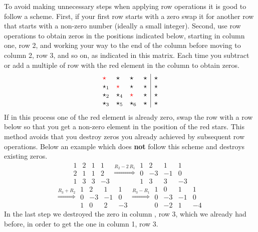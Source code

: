 \documentclass[
  a4paper,
  DIV=11,
  numbers=noendperiod,
  oneside]{scrreprt}
\theoremstyle{definition}
\theoremstyle{remark}
\begin{document}
\begin{tcolorbox}
To avoid making unnecessary steps when applying row operations it is
good to follow a scheme. First, if your first row starts with a zero
swap it for another row that starts with a non-zero number (ideally a
small integer). Second, use row operations to obtain zeros in the
positions indicated below, starting in column one, row 2, and working
your way to the end of the column before moving to column 2, row 3, and
so on, as indicated in this matrix. Each time you subtract or add a
multiple of row with the red element in the column to obtain zeros.
\[\begin{array}{llll|r}
 {\color{red}\star} &  \star& \star & \star & \star  \\
 \star_1 &  {\color{red}\star} & \star & \star & \star  \\
 \star_2 &  \star_4 & {\color{red}\star}  & \star & \star  \\
 \star_3 &  \star_5 & \star_6 & \star & \star     
\end{array}\] If in this process one of the red element is already zero,
swap the row with a row below so that you get a non-zero element in the
position of the red stars. This method avoids that you destroy zeros you
already achieved by subsequent row operations. Below an example which
does \textbf{not} follow this scheme and destroys existing zeros.
\[\begin{array}{rrr|r}
  1 & 2& 1 &1 \\
   2& 1 & 1  & 2 \\
    1 & 3 & 3 & -3    
\end{array}
\stackrel{R_2-2\, R_1}{\Longrightarrow}
\begin{array}{rrr|r}
  1 & 2& 1 &1 \\
   0& -3 & -1  & 0 \\
    1 & 3 & 3 & -3    
\end{array}\] \[\stackrel{R_3 + R_2}{\Longrightarrow}
\begin{array}{rrr|r}
  1 & 2& 1 &1 \\
   0& -3 & -1  & 0 \\
     1 & 0 & 2 & -3 
\end{array}
\stackrel{R_3- R_1}{\Longrightarrow}
\begin{array}{rrr|r}
  1 & 0& 1 &1 \\
   0& -3 & -1  & 0 \\
     0 & -2 & 1 & -4 
\end{array}\] In the last step we destroyed the zero in column , row 3,
which we already had before, in order to get the one in column 1, row 3.

\end{tcolorbox}
\end{document}
